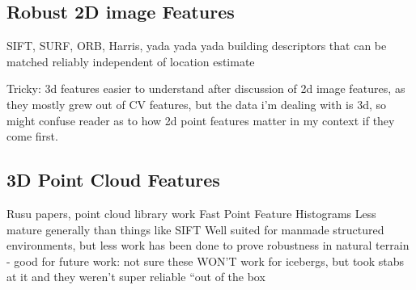 \subsection{Robust 2D image Features}

SIFT, SURF, ORB, Harris, yada yada yada
building descriptors that can be matched reliably independent of location estimate

Tricky: 3d features easier to understand after discussion of 2d image features, as they mostly grew out of CV features, but the data i'm dealing with is 3d, so might confuse reader as to how 2d point features matter in my context if they come first.


\subsection{3D Point Cloud Features}

Rusu papers, point cloud library work
Fast Point Feature Histograms 
Less mature generally than things like SIFT
Well suited for manmade structured environments, but less work has been done to prove robustness in natural terrain
    - good for future work: not sure these WON'T work for icebergs, but took stabs at it and they weren't super reliable ``out of the box


